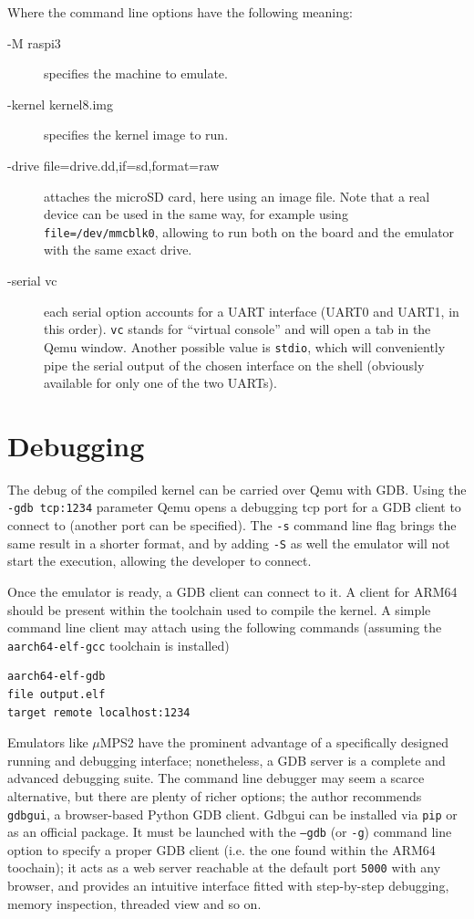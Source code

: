 \documentclass[12pt,a4paper,openright,twoside]{report}
\begin{document}
Where the command line options have the following meaning:
\begin{description}
    \item[-M raspi3] specifies the machine to emulate.
    \item[-kernel kernel8.img] specifies the kernel image to run.
    \item[-drive file=drive.dd,if=sd,format=raw] attaches the microSD card, here
        using an image file. Note that a real device can be used in the same way,
        for example using {\tt file=/dev/mmcblk0}, allowing to run both on the
        board and the emulator with the same exact drive.
    \item[-serial vc] each serial option accounts for a UART interface (UART0 and UART1,
        in this order). {\tt vc} stands for ``virtual console'' and will open a 
        tab in the Qemu window. Another possible value is {\tt stdio}, which will
        conveniently pipe the serial output of the chosen interface on the shell
        (obviously available for only one of the two UARTs).
\end{description}

\section{Debugging}
The debug of the compiled kernel can be carried over Qemu with GDB. Using the
{\tt -gdb tcp:1234} parameter Qemu opens a debugging tcp port for a GDB client
to connect to (another port can be specified). The {\tt -s} command line flag 
brings the same result in a shorter format, and by adding {\tt -S} as well the
emulator will not start the execution, allowing the developer to connect.

Once the emulator is ready, a GDB client can connect to it. A client for
ARM64 should be present within the toolchain used to compile the kernel.
 A simple command line client may attach using the following commands (assuming
 the {\tt aarch64-elf-gcc} toolchain is installed)

\begin{lstlisting}
aarch64-elf-gdb
file output.elf
target remote localhost:1234
\end{lstlisting}

Emulators like $\mu$MPS2 have the prominent advantage of a specifically designed
running and debugging interface; nonetheless, a GDB server is a complete and
advanced debugging suite. The command line debugger may seem a scarce alternative,
but there are plenty of richer options; the author recommends {\tt gdbgui}, 
a browser-based Python GDB client.
Gdbgui can be installed via {\tt pip} or as an official package. It must be launched
with the {\tt --gdb} (or {\tt -g}) command line option to specify a proper GDB
client (i.e. the one found within the ARM64 toochain); it acts as a web server
reachable at the default port {\tt 5000} with any browser, and provides an intuitive
interface fitted with step-by-step debugging, memory inspection, threaded view and
so on.
\end{document}
